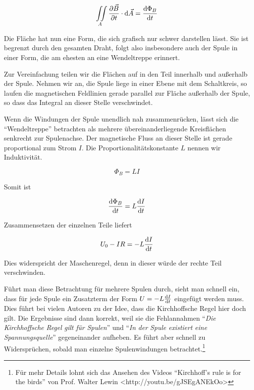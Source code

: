 \documentclass[a4paper,german,12pt,smallheadings]{scrartcl}
\begin{document}
\begin{equation}
  \iint\limits_{A} \frac{\partial \vec{B}}{\partial t} \cdot \dif \vec{A} = \frac{\dif \Phi_B}{\dif t}
\end{equation}

Die Fläche hat nun eine Form, die sich grafisch nur schwer darstellen lässt.
Sie ist begrenzt durch den gesamten Draht, folgt also insbesondere auch der
Spule in einer Form, die am ehesten an eine Wendeltreppe erinnert.

Zur Vereinfachung teilen wir die Flächen auf in den Teil innerhalb und
außerhalb der Spule. Nehmen wir an, die Spule liege in einer Ebene mit dem
Schaltkreis, so laufen die magnetischen Feldlinien gerade parallel zur Fläche
außerhalb der Spule, so dass das Integral an dieser Stelle verschwindet.

Wenn die Windungen der Spule unendlich nah zusammenrücken, lässt sich die
``Wendeltreppe'' betrachten als mehrere übereinanderliegende Kreisflächen
senkrecht zur Spulenachse. Der magnetische Fluss an dieser Stelle ist gerade
proportional zum Strom $I$. Die Proportionalitätskonstante $L$ nennen wir
Induktivität.

\begin{equation}
  \Phi_B = L I
\end{equation}

Somit ist

\begin{equation}
  \frac{\dif \Phi_B}{\dif t} = L \frac{\dif I}{\dif t}
\end{equation}

Zusammensetzen der einzelnen Teile liefert

\begin{equation}
  U_0 - IR = -L \frac{\dif I}{\dif t}
\end{equation}

Dies widerspricht der Maschenregel, denn in dieser würde der rechte Teil
verschwinden.

Führt man diese Betrachtung für mehrere Spulen durch, sieht man schnell ein,
dass für jede Spule ein Zusatzterm der Form $U = -L \frac{\dif I}{\dif t}$
eingefügt werden muss. Dies führt bei vielen Autoren zu der Idee, dass die
Kirchhoffsche Regel hier doch gilt. Die Ergebnisse sind dann korrekt, weil sie
die Fehlannahmen ``\textit{Die Kirchhoffsche Regel gilt für Spulen}'' und
``\textit{In der Spule existiert eine Spannungsquelle}'' gegeneinander
aufheben. Es führt aber schnell zu Widersprüchen, sobald man einzelne
Spulenwindungen betrachtet.\footnote{Für mehr Details lohnt sich das Ansehen
des Videos ``Kirchhoff's rule is for the birds'' von Prof. Walter Lewin
<http://youtu.be/gJSEgANEkOo>}
\end{document}
